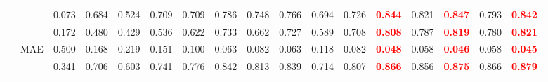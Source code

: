 \documentclass[runningheads]{llncs}
\begin{document}
\begin{table}[t]
{\begin{tabular}{@{}rl|ccccccccccc|cc|cc@{}}
    &             & 0.073                                     & 0.684                                       & 0.524                                       & 0.709                                  & 0.709                                      & 0.786                                          & 0.748                                      & 0.766                                        & 0.694                                            & 0.726                                      & \textcolor{red}{\textbf{0.844}} & 0.821                                          & \textcolor{red}{\textbf{0.847}} & 0.793                                     & \textcolor{red}{\textbf{0.842}} \\
    &  & 0.172                                     & 0.480                                       & 0.429                                       & 0.536                                  & 0.622                                      & 0.733                                          & 0.662                                      & 0.727                                        & 0.589                                            & 0.708                                      & \textcolor{red}{\textbf{0.808}} & 0.787                                          & \textcolor{red}{\textbf{0.819}} & 0.780                                     & \textcolor{red}{\textbf{0.821}} \\
    & MAE                  & 0.500                                     & 0.168                                       & 0.219                                       & 0.151                                  & 0.100                                      & 0.063                                          & 0.082                                      & 0.063                                        & 0.118                                            & 0.082                                      & \textcolor{red}{\textbf{0.048}} & 0.058                                          & \textcolor{red}{\textbf{0.046}} & 0.058                                     & \textcolor{red}{\textbf{0.045}} \\
    &               & 0.341                                     & 0.706                                       & 0.603                                       & 0.741                                  & 0.776                                      & 0.842                                          & 0.813                                      & 0.839                                        & 0.714                                            & 0.807                                      & \textcolor{red}{\textbf{0.866}} & 0.856                                          & \textcolor{red}{\textbf{0.875}} & 0.866                                     & \textcolor{red}{\textbf{0.879}} \\

\end{tabular}}
\end{table}
\end{document}
